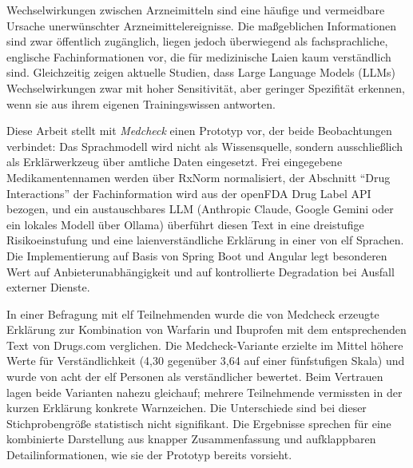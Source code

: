
Wechselwirkungen zwischen Arzneimitteln sind eine häufige und vermeidbare Ursache unerwünschter Arzneimittelereignisse. Die maßgeblichen Informationen sind zwar öffentlich zugänglich, liegen jedoch überwiegend als fachsprachliche, englische Fachinformationen vor, die für medizinische Laien kaum verständlich sind. Gleichzeitig zeigen aktuelle Studien, dass Large Language Models (LLMs) Wechselwirkungen zwar mit hoher Sensitivität, aber geringer Spezifität erkennen, wenn sie aus ihrem eigenen Trainingswissen antworten.

Diese Arbeit stellt mit \emph{Medcheck} einen Prototyp vor, der beide Beobachtungen verbindet: Das Sprachmodell wird nicht als Wissensquelle, sondern ausschließlich als Erklärwerkzeug über amtliche Daten eingesetzt. Frei eingegebene Medikamentennamen werden über RxNorm normalisiert, der Abschnitt \enquote{Drug Interactions} der Fachinformation wird aus der openFDA Drug Label API bezogen, und ein austauschbares LLM (Anthropic Claude, Google Gemini oder ein lokales Modell über Ollama) überführt diesen Text in eine dreistufige Risikoeinstufung und eine laienverständliche Erklärung in einer von elf Sprachen. Die Implementierung auf Basis von Spring Boot und Angular legt besonderen Wert auf Anbieterunabhängigkeit und auf kontrollierte Degradation bei Ausfall externer Dienste.

In einer Befragung mit elf Teilnehmenden wurde die von Medcheck erzeugte Erklärung zur Kombination von Warfarin und Ibuprofen mit dem entsprechenden Text von Drugs.com verglichen. Die Medcheck-Variante erzielte im Mittel höhere Werte für Verständlichkeit (4{,}30 gegenüber 3{,}64 auf einer fünfstufigen Skala) und wurde von acht der elf Personen als verständlicher bewertet. Beim Vertrauen lagen beide Varianten nahezu gleichauf; mehrere Teilnehmende vermissten in der kurzen Erklärung konkrete Warnzeichen. Die Unterschiede sind bei dieser Stichprobengröße statistisch nicht signifikant. Die Ergebnisse sprechen für eine kombinierte Darstellung aus knapper Zusammenfassung und aufklappbaren Detailinformationen, wie sie der Prototyp bereits vorsieht.
